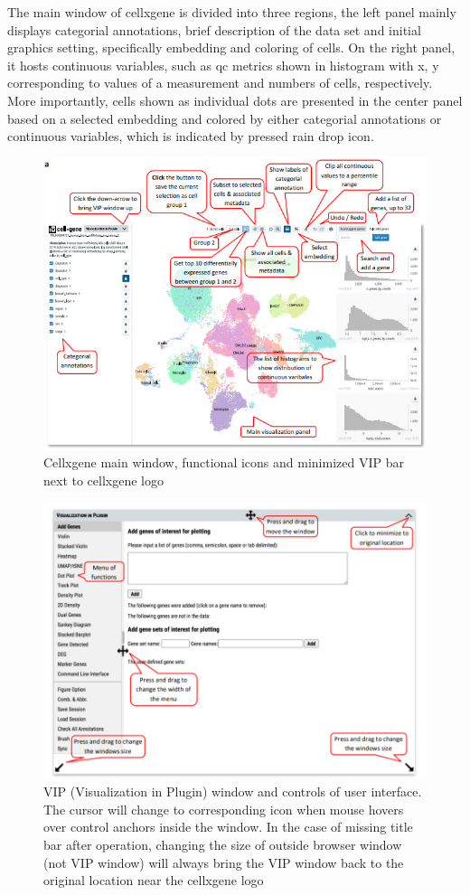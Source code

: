 \documentclass[
]{article}
\begin{document}
The main window of cellxgene is divided into three regions, the left panel mainly displays categorial
annotations, brief description of the data set and initial graphics setting, specifically embedding and
coloring of cells. On the right panel, it hosts continuous variables, such as qc metrics shown in histogram
with x, y corresponding to values of a measurement and numbers of cells, respectively. More
importantly, cells shown as individual dots are presented in the center panel based on a selected
embedding and colored by either categorial annotations or continuous variables, which is indicated by
pressed rain drop icon.

\begin{figure}
\centering
\includegraphics{figures/F1A.jpg}
\caption{Cellxgene main window, functional icons and minimized VIP bar next to cellxgene logo}
\end{figure}

\begin{figure}
\centering
\includegraphics{figures/F1B.jpg}
\caption{VIP (Visualization in Plugin) window and controls of user interface. The cursor will change to corresponding icon when mouse hovers over control anchors inside the window. In the case of missing title bar after operation, changing the size of outside browser window (not VIP window) will always bring the VIP window back to the original location near the cellxgene logo}
\end{figure}
\end{document}
